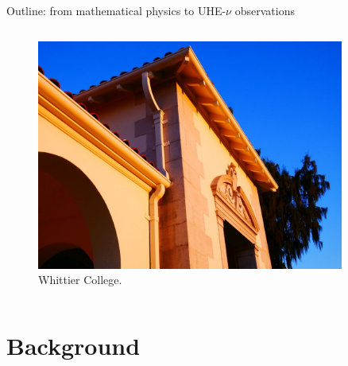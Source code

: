 \documentclass{beamer}
\begin{document}
\begin{frame}{Outline: from mathematical physics to UHE-$\nu$ observations}
\begin{columns}[T]
\begin{column}{0.5\textwidth}
\begin{figure}
\includegraphics[width=0.9\textwidth]{whittier1.jpeg}
\caption{\small Whittier College.}
\end{figure}
\end{column}
\end{columns}
\end{frame}

\section{Background}
\end{document}
